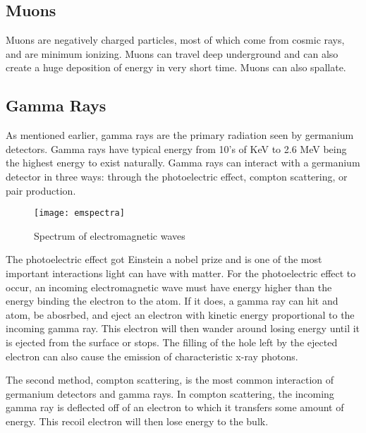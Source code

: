 \subsection{Muons}
Muons are negatively charged particles, most of which come from cosmic rays, and are minimum ionizing. 
Muons can travel deep underground and can also create a huge deposition of energy in very short time.
Muons can also spallate.

\subsection{Gamma Rays}
As mentioned earlier, gamma rays are the primary radiation seen by germanium detectors.
Gamma rays have typical energy from 10's of KeV to 2.6 MeV being the highest energy to exist naturally.
Gamma rays can interact with a germanium detector in three ways: through the photoelectric effect, compton scattering, or pair production.
\begin{figure}[htpb]
\centering
\texttt{[image: emspectra]}
\caption{Spectrum of electromagnetic waves}
\label{fig:emspectra}
\end{figure}

The photoelectric effect got Einstein a nobel prize and is one of the most important interactions light can have with matter.
For the photoelectric effect to occur, an incoming electromagnetic wave must have energy higher than the energy binding the electron to the atom.
If it does, a gamma ray can hit and atom, be abosrbed, and eject an electron with kinetic energy proportional to the incoming gamma ray.
This electron will then wander around losing energy until it is ejected from the surface or stops.
The filling of the hole left by the ejected electron can also cause the emission of characteristic x-ray photons.

The second method, compton scattering, is the most common interaction of germanium detectors and gamma rays.
In compton scattering, the incoming gamma ray is deflected off of an electron to which it transfers some amount of energy.
This recoil electron will then lose energy to the bulk.

